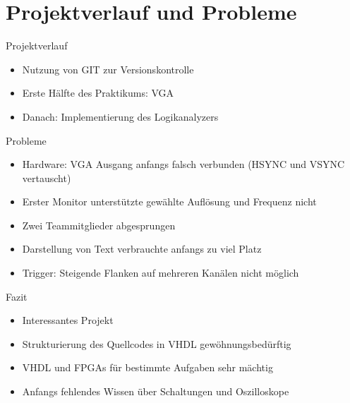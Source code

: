 \section{Projektverlauf und Probleme}
\begin{frame}[<+->]{Projektverlauf}
    \begin{itemize}
        \item Nutzung von GIT zur Versionskontrolle
        \item Erste Hälfte des Praktikums: VGA
        \item Danach: Implementierung des Logikanalyzers
    \end{itemize}
\end{frame}
\begin{frame}[<+->]{Probleme}
    \begin{itemize}
        \item Hardware: VGA Ausgang anfangs falsch verbunden (HSYNC und VSYNC vertauscht)
        \item Erster Monitor unterstützte gewählte Auflösung und Frequenz nicht
        \item Zwei Teammitglieder abgesprungen
        \item Darstellung von Text verbrauchte anfangs zu viel Platz
        \item Trigger: Steigende Flanken auf mehreren Kanälen nicht möglich
    \end{itemize}
\end{frame}
\begin{frame}[<+->]{Fazit}
    \begin{itemize}
        \item Interessantes Projekt
        \item Strukturierung des Quellcodes in VHDL gewöhnungsbedürftig
        \item VHDL und FPGAs für bestimmte Aufgaben sehr mächtig
        \item Anfangs fehlendes Wissen über Schaltungen und Oszilloskope
    \end{itemize}
\end{frame}
